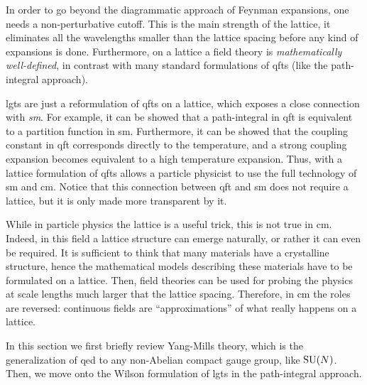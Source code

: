 In order to go beyond the diagrammatic approach of Feynman expansions, one needs a non-perturbative cutoff.
This is the main strength of the lattice, it eliminates all the wavelengths smaller than the lattice spacing before any kind of expansions is done.
Furthermore, on a lattice a field theory is \emph{mathematically well-defined}, in contrast with many standard formulations of \ac{qft}s (like the path-integral approach).

\Acp{lgt} are just a reformulation of \acp{qft} on a lattice, which exposes a close connection with \emph{\ac{sm}}.
For example, it can be showed that a path-integral in \ac{qft} is equivalent to a partition function in \ac{sm}.
Furthermore, it can be showed that the coupling constant in \ac{qft} corresponds directly to the temperature, and a strong coupling expansion becomes equivalent to a high temperature expansion.
Thus, with a lattice formulation of \ac{qft}s allows a particle physicist to use the full technology of \ac{sm} and \ac{cm}.
Notice that this connection between \ac{qft} and \ac{sm} does not require a lattice, but it is only made more transparent by it.

While in particle physics the lattice is a useful trick, this is not true in \ac{cm}.
Indeed, in this field a lattice structure can emerge naturally, or rather it can even be required.
It is sufficient to think that many materials have a crystalline structure, hence the mathematical models describing these materials have to be formulated on a lattice.
Then, field theories can be used for probing the physics at scale lengths much larger that the lattice spacing.
Therefore, in \ac{cm} the roles are reversed: continuous fields are ``approximations'' of what really happens on a lattice.


\bigskip

In this section we first briefly review Yang-Mills theory, which is the generalization of \ac{qed} to any non-Abelian compact gauge group, like $\text{SU}(N)$.
Then, we move onto the Wilson formulation of \acp{lgt} in the path-integral approach.




